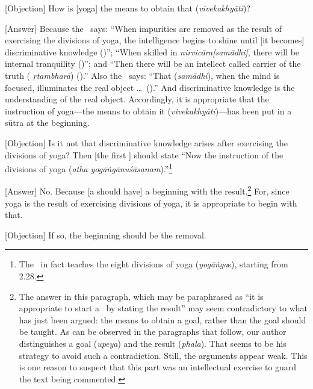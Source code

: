 [Objection]%
 How is [yoga] the means to obtain that (\emph{vivekakhyāti})?

[Answer]%
 Because the \Sutrakara\ says: ``When
impurities are removed as the result of exercising the divisions of
yoga, the intelligence begins to shine until [it becomes]
discriminative knowledge ()''; ``When skilled in \emph{%
  nirvicāra[samādhi]}, there will be internal tranquility ()'';
and ``Then there will be an intellect called carrier of the truth (\emph{%
  ṛtambharā}) ().''  Also the \Bhasyakara\ says:
``That (\emph{samādhi}), %
when the mind is focused, illuminates the real object \ldots\ ().''  And discriminative knowledge is the understanding
of the real object.  Accordingly, it is appropriate that the instruction of yoga---the means to obtain it (\emph{vivekakhyāti})---has been put in a sūtra at the beginning.

[Objection]%
 Is it not that discriminative
knowledge arises after exercising the divisions of yoga? Then [the first
\sutra] should state ``Now the instruction of the divisions of
yoga (\emph{atha yogāṅgānuśāsanam}).''\footnote{The \PYS\ in fact teaches the eight divisions of yoga (\emph{yogāṅga}s), starting from 2.28.}

[Answer] No.%
 Because [a \sastra\/
should have] a beginning with the result.\footnote{The answer in this paragraph, which may be paraphrased as ``it is appropriate to start a \sastra\ by stating the result'' may seem contradictory to what has just been argued: the means to obtain a goal, rather than the goal should be taught.  As can be observed in the paragraphs that follow, our author distinguishes a goal (\emph{upeya}) and the result (\emph{phala}).  That seems to be his strategy to avoid such a contradiction.  Still, the arguments appear weak.  This is one reason to suspect that this part was an intellectual exercise to guard the text being commented.}  For, since yoga is the result of
exercising divisions of yoga, it is appropriate to begin with that.

[Objection] If%
 so, the beginning should be the removal.

